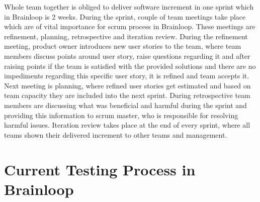 Whole team together is obliged to deliver software increment in one sprint which in Brainloop is 2 weeks. During the sprint, couple of team meetings take place which are of vital importance for scrum process in Brainloop. These meetings are refinement, planning, retrospective and iteration review. During the refinement meeting, product owner introduces new user stories to the team, where team members discuss points around user story, raise questions regarding it and after raising points if the team is satisfied with the provided solutions and there are no impediments regarding this specific user story, it is refined and team accepts it. Next meeting is planning, where refined user stories get estimated and based on team capacity they are included into the next sprint. During retrospective team members are discussing what was beneficial and harmful during the sprint and providing this information to scrum master, who is responsible for resolving harmful issues. Iteration review takes place at the end of every sprint, where all teams shown their delivered increment to other teams and management.

\section{Current Testing Process in Brainloop}


